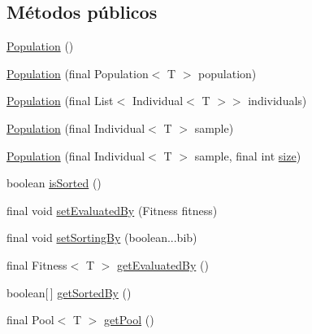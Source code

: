 \subsection*{Métodos públicos}
\begin{DoxyCompactItemize}
\item 
\hyperlink{classjenes_1_1population_1_1_population_3_01_t_01extends_01_chromosome_01_4_a0f7b4a9eda8a4dadbc70f8585def56bd}{Population} ()
\item 
\hyperlink{classjenes_1_1population_1_1_population_3_01_t_01extends_01_chromosome_01_4_a30e57f3d2c31bc1c7070557b0d6d4d33}{Population} (final Population$<$ T $>$ population)
\item 
\hyperlink{classjenes_1_1population_1_1_population_3_01_t_01extends_01_chromosome_01_4_a22f453b17c143bdeb4ca7597163e5899}{Population} (final List$<$ Individual$<$ T $>$$>$ individuals)
\item 
\hyperlink{classjenes_1_1population_1_1_population_3_01_t_01extends_01_chromosome_01_4_a0a0c6c3fdf74d042c638022694b47d53}{Population} (final Individual$<$ T $>$ sample)
\item 
\hyperlink{classjenes_1_1population_1_1_population_3_01_t_01extends_01_chromosome_01_4_ae4dc3ffb0550ac33bf726b4c9e531600}{Population} (final Individual$<$ T $>$ sample, final int \hyperlink{classjenes_1_1population_1_1_population_3_01_t_01extends_01_chromosome_01_4_adb9f8282e00932d31fddaa4218c5712e}{size})
\item 
boolean \hyperlink{classjenes_1_1population_1_1_population_3_01_t_01extends_01_chromosome_01_4_a1d0332ff448da8e153fa5f5b17966ccc}{is\-Sorted} ()
\item 
final void \hyperlink{classjenes_1_1population_1_1_population_3_01_t_01extends_01_chromosome_01_4_a569c046ba0bc1905fe60287dd26b5854}{set\-Evaluated\-By} (Fitness fitness)
\item 
final void \hyperlink{classjenes_1_1population_1_1_population_3_01_t_01extends_01_chromosome_01_4_ab0b674564e78c0f005db4aa32ade31ae}{set\-Sorting\-By} (boolean...\-bib)
\item 
final Fitness$<$ T $>$ \hyperlink{classjenes_1_1population_1_1_population_3_01_t_01extends_01_chromosome_01_4_ab50a1d2686fe3733e0fbd094fc91b35e}{get\-Evaluated\-By} ()
\item 
boolean\mbox{[}$\,$\mbox{]} \hyperlink{classjenes_1_1population_1_1_population_3_01_t_01extends_01_chromosome_01_4_a04da91b60ee40df76527c46f6bc47492}{get\-Sorted\-By} ()
\item 
final Pool$<$ T $>$ \hyperlink{classjenes_1_1population_1_1_population_3_01_t_01extends_01_chromosome_01_4_a366ef0124b1007ce7494c974279cb2a7}{get\-Pool} ()
$$
\end{DoxyCompactItemize}
